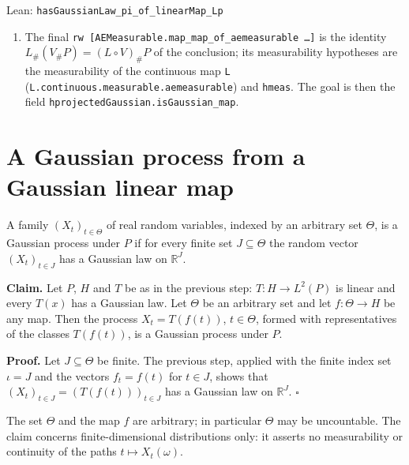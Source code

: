 \documentclass[11pt,a4paper]{article}
\begin{document}
\begin{leanbox}{Lean: \texttt{hasGaussianLaw\_\allowbreak{}pi\_\allowbreak{}of\_\allowbreak{}linearMap\_\allowbreak{}Lp}}
\begin{enumerate}
\item The final \texttt{rw [AEMeasurable.\allowbreak{}map\_\allowbreak{}map\_\allowbreak{}of\_\allowbreak{}aemeasurable …]} is the identity \(L_\#(V_\#P)=(L\circ V)_\#P\) of the conclusion; its measurability hypotheses are the measurability of the continuous map \texttt{L} (\texttt{L.\allowbreak{}continuous.\allowbreak{}measurable.\allowbreak{}aemeasurable}) and \texttt{hmeas}. The goal is then the field \texttt{hprojected\allowbreak{}Gaussian.\allowbreak{}is\allowbreak{}Gaussian\_\allowbreak{}map}.

\end{enumerate}
\end{leanbox}

\section{\texorpdfstring{A Gaussian process from a Gaussian linear map}{A Gaussian process from a Gaussian linear map}}


A family \((X_t)_{t\in\Theta}\) of real random variables, indexed by an arbitrary set \(\Theta\), is a Gaussian process under \(P\) if for every finite set \(J\subseteq\Theta\) the random vector \((X_t)_{t\in J}\) has a Gaussian law on \(\mathbb R^J\).




\textbf{Claim.} Let \(P\), \(H\) and \(T\) be as in the previous step: \(T:H\to L^2(P)\) is linear and every \(T(x)\) has a Gaussian law. Let \(\Theta\) be an arbitrary set and let \(f:\Theta\to H\) be any map. Then the process \(X_t=T(f(t))\), \(t\in\Theta\), formed with representatives of the classes \(T(f(t))\), is a Gaussian process under \(P\).




\textbf{Proof.} Let \(J\subseteq\Theta\) be finite. The previous step, applied with the finite index set \(\iota=J\) and the vectors \(f_t=f(t)\) for \(t\in J\), shows that \((X_t)_{t\in J}=(T(f(t)))_{t\in J}\) has a Gaussian law on \(\mathbb R^J\). \(\square\)




The set \(\Theta\) and the map \(f\) are arbitrary; in particular \(\Theta\) may be uncountable. The claim concerns finite-dimensional distributions only: it asserts no measurability or continuity of the paths \(t\mapsto X_t(\omega)\).
\end{document}
